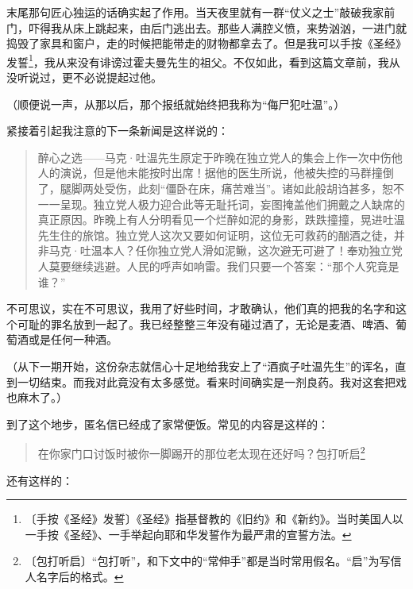\documentclass[12pt,UTF-8,openany]{ctexbook}
\begin{document}
\begin{large}
    末尾那句匠心独运的话确实起了作用。当天夜里就有一群“仗义之士”敲破我家前门，吓得我从床上跳起来，由后门逃出去。那些人满腔义愤，来势汹汹，一进门就捣毁了家具和窗户，走的时候把能带走的财物都拿去了。但是我可以手按《圣经》发誓\footnote{〔手按《圣经》发誓〕《圣经》指基督教的《旧约》和《新约》。当时美国人以一手按《圣经》、一手举起向耶和华发誓作为最严肃的宣誓方法。}，我从来没有诽谤过霍夫曼先生的祖父。不仅如此，看到这篇文章前，我从没听说过，更不必说提起过他。
    
    （顺便说一声，从那以后，那个报纸就始终把我称为“侮尸犯吐温”。）
    
    紧接着引起我注意的下一条新闻是这样说的：
    
    \begin{quotation}
    
    醉心之选——马克·吐温先生原定于昨晚在独立党人的集会上作一次中伤他人的演说，但是他未能按时出席！据他的医生所说，他被失控的马群撞倒了，腿脚两处受伤，此刻“僵卧在床，痛苦难当”。诸如此般胡诌甚多，恕不一一呈现。独立党人极力迎合此等无耻托词，妄图掩盖他们拥戴之人缺席的真正原因。昨晚上有人分明看见一个烂醉如泥的身影，跌跌撞撞，晃进吐温先生住的旅馆。独立党人这次又要如何证明，这位无可救药的酗酒之徒，并非马克·吐温本人？任你独立党人滑如泥鳅，这次避无可避了！奉劝独立党人莫要继续逃避。人民的呼声如响雷。我们只要一个答案：“那个人究竟是谁？”
    
    \end{quotation}
    
    不可思议，实在不可思议，我用了好些时间，才敢确认，他们真的把我的名字和这个可耻的罪名放到一起了。我已经整整三年没有碰过酒了，无论是麦酒、啤酒、葡萄酒或是任何一种酒。
    
    （从下一期开始，这份杂志就信心十足地给我安上了“酒疯子吐温先生”的诨名，直到一切结束。而我对此竟没有太多感觉。看来时间确实是一剂良药。我对这套把戏也麻木了。）
    
    到了这个地步，匿名信已经成了家常便饭。常见的内容是这样的：
    
    \begin{quotation}
    
    在你家门口讨饭时被你一脚踢开的那位老太现在还好吗？包打听启\footnote{〔包打听启〕“包打听”，和下文中的“常伸手”都是当时常用假名。“启”为写信人名字后的格式。}
    
    \end{quotation}
    
    还有这样的：
    
    \begin{quotation}
    

\end{quotation}
\end{large}
\end{document}
